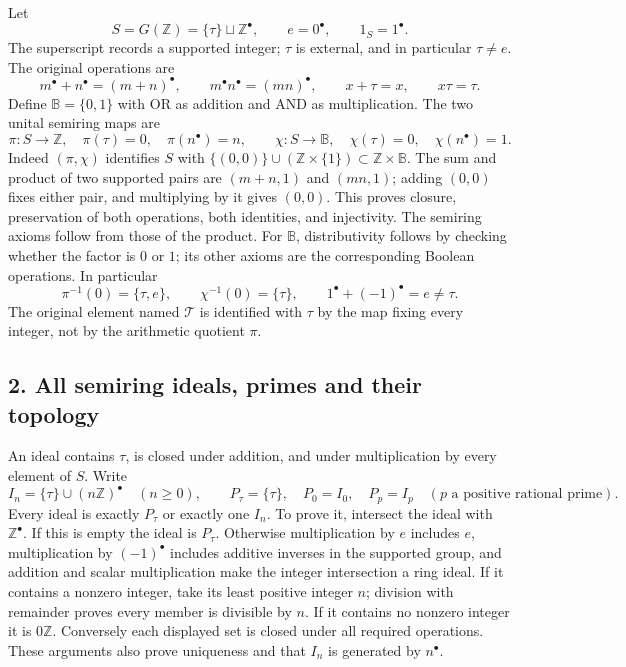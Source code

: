 \documentclass[
  10pt,
]{article}
\begin{document}
Let \[
S=G(\mathbb Z)=\{\tau\}\sqcup\mathbb Z^\bullet,
\qquad e=0^\bullet,\qquad 1_S=1^\bullet.
\tag{TPS1}
\] The superscript records a supported integer; \(\tau\) is external,
and in particular \(\tau\ne e\). The original operations are \[
m^\bullet+n^\bullet=(m+n)^\bullet,\qquad
m^\bullet n^\bullet=(mn)^\bullet,\qquad
x+\tau=x,\qquad x\tau=\tau.
\tag{TPS2}
\] Define \(\mathbb B=\{0,1\}\) with OR as addition and AND as
multiplication. The two unital semiring maps are \[
\pi:S\to\mathbb Z,\quad \pi(\tau)=0,\quad\pi(n^\bullet)=n,
\qquad
\chi:S\to\mathbb B,\quad \chi(\tau)=0,\quad\chi(n^\bullet)=1.
\tag{TPS3}
\] Indeed \((\pi,\chi)\) identifies \(S\) with
\(\{(0,0)\}\cup(\mathbb Z\times\{1\})\subset\mathbb Z\times\mathbb B\).
The sum and product of two supported pairs are \((m+n,1)\) and
\((mn,1)\); adding \((0,0)\) fixes either pair, and multiplying by it
gives \((0,0)\). This proves closure, preservation of both operations,
both identities, and injectivity. The semiring axioms follow from those
of the product. For \(\mathbb B\), distributivity follows by checking
whether the factor is \(0\) or \(1\); its other axioms are the
corresponding Boolean operations. In particular \[
\pi^{-1}(0)=\{\tau,e\},\qquad
\chi^{-1}(0)=\{\tau\},\qquad
1^\bullet+(-1)^\bullet=e\ne\tau.
\tag{TPS4}
\] The original element named \(\mathcal T\) is identified with \(\tau\)
by the map fixing every integer, not by the arithmetic quotient \(\pi\).

\subsection{2. All semiring ideals, primes and their
topology}\label{all-semiring-ideals-primes-and-their-topology}

An ideal contains \(\tau\), is closed under addition, and under
multiplication by every element of \(S\). Write \[
I_n=\{\tau\}\cup(n\mathbb Z)^\bullet\quad(n\ge0),
\qquad P_\tau=\{\tau\},\quad P_0=I_0,\quad P_p=I_p
\quad(p\text{ a positive rational prime}).
\tag{TPS5}
\] Every ideal is exactly \(P_\tau\) or exactly one \(I_n\). To prove
it, intersect the ideal with \(\mathbb Z^\bullet\). If this is empty the
ideal is \(P_\tau\). Otherwise multiplication by \(e\) includes \(e\),
multiplication by \((-1)^\bullet\) includes additive inverses in the
supported group, and addition and scalar multiplication make the integer
intersection a ring ideal. If it contains a nonzero integer, take its
least positive integer \(n\); division with remainder proves every
member is divisible by \(n\). If it contains no nonzero integer it is
\(0\mathbb Z\). Conversely each displayed set is closed under all
required operations. These arguments also prove uniqueness and that
\(I_n\) is generated by \(n^\bullet\).
\end{document}
